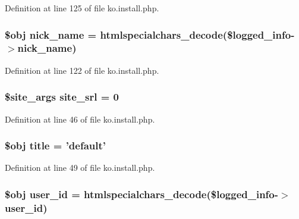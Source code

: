 Definition at line 125 of file ko.\+install.\+php.

\hypertarget{ko_8install_8php_a151ecae87a1f3d7e257aa089803086bd}{
\subsubsection[{nick\+\_\+name}]{\setlength{\rightskip}{0pt plus 5cm}\$obj nick\+\_\+name = htmlspecialchars\+\_\+decode(\$logged\+\_\+info-\/$>$nick\+\_\+name)}}\label{ko_8install_8php_a151ecae87a1f3d7e257aa089803086bd}


Definition at line 122 of file ko.\+install.\+php.

\hypertarget{ko_8install_8php_a8b1406b4ad1048041558dce6bfe89004}{
\subsubsection[{site\+\_\+srl}]{\setlength{\rightskip}{0pt plus 5cm}\$site\+\_\+args site\+\_\+srl = 0}}\label{ko_8install_8php_a8b1406b4ad1048041558dce6bfe89004}


Definition at line 46 of file ko.\+install.\+php.

\hypertarget{ko_8install_8php_a5b072c5fd1d2228c6ba5cee13cd142e3}{
\subsubsection[{title}]{\setlength{\rightskip}{0pt plus 5cm}\$obj title = 'default'}}\label{ko_8install_8php_a5b072c5fd1d2228c6ba5cee13cd142e3}


Definition at line 49 of file ko.\+install.\+php.

\hypertarget{ko_8install_8php_a74f1a394389d774e5b4cd5d1d15413f7}{
\subsubsection[{user\+\_\+id}]{\setlength{\rightskip}{0pt plus 5cm}\$obj user\+\_\+id = htmlspecialchars\+\_\+decode(\$logged\+\_\+info-\/$>$user\+\_\+id)}}\label{ko_8install_8php_a74f1a394389d774e5b4cd5d1d15413f7}


